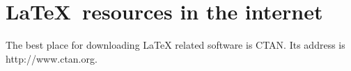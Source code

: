 \documentclass{article}
\begin{document}
\section{\sffamily\LaTeX\ resources in the internet}
The best place for downloading LaTeX related software is CTAN.
Its address is \ttfamily http://www.ctan.org\rmfamily.
\end{document}
